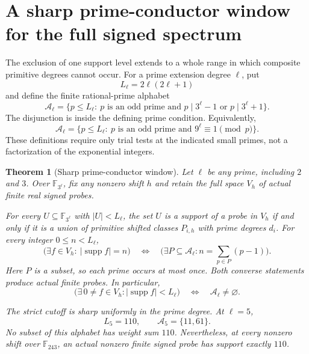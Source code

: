 \documentclass[11pt]{article}
\newtheorem{theorem}{Theorem}[section]
\begin{document}
\section{A sharp prime-conductor window for the full signed spectrum}
\label{sec:odd-pell-prime-window}

The exclusion of one support level extends to a whole range
in which composite primitive degrees cannot occur.
For a prime extension degree \(\ell\), put
\[
                   L_\ell=2\ell(2\ell+1)
\]
and define the finite rational-prime alphabet
\[
 \mathcal A_\ell=
 \{p\le L_\ell:\ p\text{ is an odd prime and }
                       p\mid3^\ell-1\text{ or }p\mid3^\ell+1\}.
\]
The disjunction is inside the defining prime condition.
Equivalently,
\[
 \mathcal A_\ell=
 \{p\le L_\ell:\ p\text{ is an odd prime and }
                                9^\ell\equiv1\pmod p\}.
\]
These definitions require only trial tests at the indicated
small primes, not a factorization of the exponential integers.

\begin{theorem}[Sharp prime-conductor window]
\label{thm:odd-pell-prime-window}
Let \(\ell\) be any prime, including \(2\) and \(3\).
Over \(\mathbb F_{3^\ell}\), fix any nonzero shift \(h\)
and retain the full space \(V_h\) of actual finite
real signed probes.

For every \(U\subseteq\mathbb F_{3^\ell}\) with
\(|U|<L_\ell\), the set \(U\) is a support of a probe
in \(V_h\) if and only if it is a union of primitive
shifted classes \(P_{i,h}\) with prime degrees \(d_i\).
For every integer \(0\le n<L_\ell\),
\[
 \bigl(\exists f\in V_h:\ |\operatorname{supp}f|=n\bigr)
 \quad\Longleftrightarrow\quad
 \bigl(\exists P\subseteq\mathcal A_\ell:
                          n=\sum_{p\in P}(p-1)\bigr).
\]
Here \(P\) is a subset, so each prime occurs at most once.
Both converse statements produce actual finite probes.
In particular,
\[
 \bigl(\exists\,0\ne f\in V_h:
                    |\operatorname{supp}f|<L_\ell\bigr)
                    \quad\Longleftrightarrow\quad
                           \mathcal A_\ell\ne\varnothing.
\]

The strict cutoff is sharp uniformly in the prime degree.
At \(\ell=5\),
\[
              L_5=110,\qquad \mathcal A_5=\{11,61\}.
\]
No subset of this alphabet has weight sum \(110\).
Nevertheless, at every nonzero shift over
\(\mathbb F_{243}\), an actual nonzero finite signed
probe has support exactly \(110\).
\end{theorem}
\end{document}
